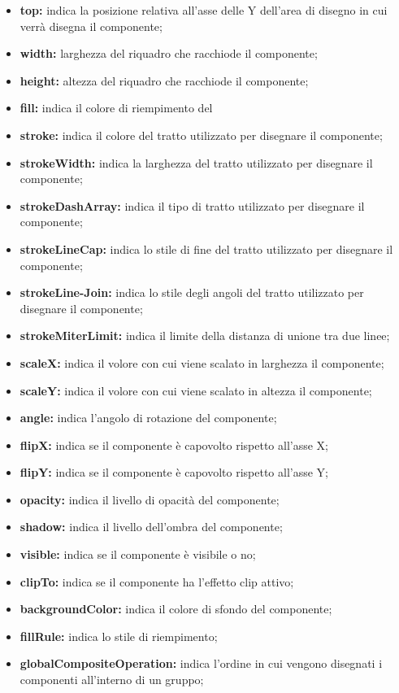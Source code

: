 \begin{itemize}
\begin{itemize}
			\item \textbf{top:} indica la posizione relativa all'asse delle Y dell'area di disegno in cui verrà disegna il componente;
			\item \textbf{width:} larghezza del riquadro che racchiode il componente;
			\item \textbf{height:} altezza del riquadro che racchiode il componente;
			\item \textbf{fill:} indica il colore di riempimento del
			\item \textbf{stroke:} indica il colore del tratto utilizzato per disegnare il componente;
			\item \textbf{strokeWidth:} indica la larghezza del tratto utilizzato per disegnare il componente;
			\item \textbf{strokeDashArray:} indica il tipo di tratto utilizzato per disegnare il componente;
			\item \textbf{strokeLineCap:} indica lo stile di fine del tratto utilizzato per disegnare il componente;
			\item \textbf{strokeLine-Join:} indica lo stile degli angoli del tratto utilizzato per disegnare il componente;
			\item \textbf{strokeMiterLimit:} indica il limite della distanza di unione tra due linee;
			\item \textbf{scaleX:} indica il volore con cui viene scalato in larghezza il componente;
			\item \textbf{scaleY:} indica il volore con cui viene scalato in altezza il componente;
			\item \textbf{angle:} indica l'angolo di rotazione del componente;
			\item \textbf{flipX:} indica se il componente è capovolto rispetto all'asse X;
			\item \textbf{flipY:} indica se il componente è capovolto rispetto all'asse Y;
			\item \textbf{opacity:} indica il livello di opacità del componente;
			\item \textbf{shadow:} indica il livello dell'ombra del componente;
			\item \textbf{visible:} indica  se il componente è visibile o no;
			\item \textbf{clipTo:} indica se il componente ha l'effetto clip attivo;
			\item \textbf{backgroundColor:} indica il colore di sfondo del componente;
			\item \textbf{fillRule:} indica lo stile di riempimento;
			\item \textbf{globalCompositeOperation:} indica l'ordine in cui vengono disegnati i componenti all'interno di un gruppo;
		\end{itemize}
	\end{itemize}
	

